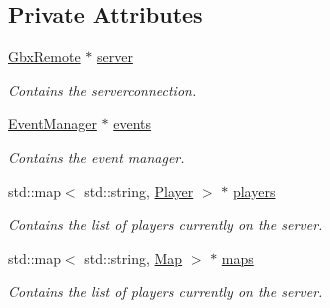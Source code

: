 \subsection*{Private Attributes}
\begin{DoxyCompactItemize}
\item 
\hypertarget{classCallBackManager_a27cccc154989a36eb80580f3d9f69c51}{\hyperlink{classGbxRemote}{Gbx\-Remote} $\ast$ \hyperlink{classCallBackManager_a27cccc154989a36eb80580f3d9f69c51}{server}}\label{classCallBackManager_a27cccc154989a36eb80580f3d9f69c51}

\begin{DoxyCompactList}\small\item\em Contains the serverconnection. \end{DoxyCompactList}\item 
\hypertarget{classCallBackManager_a144945c3b30a7946674393b412746f8f}{\hyperlink{classEventManager}{Event\-Manager} $\ast$ \hyperlink{classCallBackManager_a144945c3b30a7946674393b412746f8f}{events}}\label{classCallBackManager_a144945c3b30a7946674393b412746f8f}

\begin{DoxyCompactList}\small\item\em Contains the event manager. \end{DoxyCompactList}\item 
\hypertarget{classCallBackManager_a26e135142b37e3b02b72aa7a091ef854}{std\-::map$<$ std\-::string, \hyperlink{structPlayer}{Player} $>$ $\ast$ \hyperlink{classCallBackManager_a26e135142b37e3b02b72aa7a091ef854}{players}}\label{classCallBackManager_a26e135142b37e3b02b72aa7a091ef854}

\begin{DoxyCompactList}\small\item\em Contains the list of players currently on the server. \end{DoxyCompactList}\item 
\hypertarget{classCallBackManager_afad9b6092db2e3f98711d8e6ba6ff612}{std\-::map$<$ std\-::string, \hyperlink{structMap}{Map} $>$ $\ast$ \hyperlink{classCallBackManager_afad9b6092db2e3f98711d8e6ba6ff612}{maps}}\label{classCallBackManager_afad9b6092db2e3f98711d8e6ba6ff612}

\begin{DoxyCompactList}\small\item\em Contains the list of players currently on the server. \end{DoxyCompactList}\end{DoxyCompactItemize}


